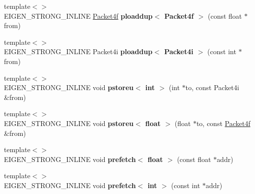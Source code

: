\begin{DoxyCompactItemize}
\item 
\mbox{\label{namespace_eigen_1_1internal_a4f98fd07c1d5009e6b536dd757688074}} 
{\footnotesize template$<$$>$ }\\E\+I\+G\+E\+N\+\_\+\+S\+T\+R\+O\+N\+G\+\_\+\+I\+N\+L\+I\+NE \hyperlink{struct_eigen_1_1internal_1_1_packet4f}{Packet4f} {\bfseries ploaddup$<$ Packet4f $>$} (const float $\ast$from)
\item 
\mbox{\label{namespace_eigen_1_1internal_a3ddf82b3b7cd925ffb814a9baca92fe5}} 
{\footnotesize template$<$$>$ }\\E\+I\+G\+E\+N\+\_\+\+S\+T\+R\+O\+N\+G\+\_\+\+I\+N\+L\+I\+NE Packet4i {\bfseries ploaddup$<$ Packet4i $>$} (const int $\ast$from)
\item 
\mbox{\label{namespace_eigen_1_1internal_abe9341bd54c8f36e4add9c441481704c}} 
{\footnotesize template$<$$>$ }\\E\+I\+G\+E\+N\+\_\+\+S\+T\+R\+O\+N\+G\+\_\+\+I\+N\+L\+I\+NE void {\bfseries pstoreu$<$ int $>$} (int $\ast$to, const Packet4i \&from)
\item 
\mbox{\label{namespace_eigen_1_1internal_aea49c19b4b3f450da1ff1a018e958eef}} 
{\footnotesize template$<$$>$ }\\E\+I\+G\+E\+N\+\_\+\+S\+T\+R\+O\+N\+G\+\_\+\+I\+N\+L\+I\+NE void {\bfseries pstoreu$<$ float $>$} (float $\ast$to, const \hyperlink{struct_eigen_1_1internal_1_1_packet4f}{Packet4f} \&from)
\item 
\mbox{\label{namespace_eigen_1_1internal_a84729d9dc9045c5aa096ce1c355da8cc}} 
{\footnotesize template$<$$>$ }\\E\+I\+G\+E\+N\+\_\+\+S\+T\+R\+O\+N\+G\+\_\+\+I\+N\+L\+I\+NE void {\bfseries prefetch$<$ float $>$} (const float $\ast$addr)
\item 
\mbox{\label{namespace_eigen_1_1internal_af11b2c02aed99a41cf13ab7c867b5ab2}} 
{\footnotesize template$<$$>$ }\\E\+I\+G\+E\+N\+\_\+\+S\+T\+R\+O\+N\+G\+\_\+\+I\+N\+L\+I\+NE void {\bfseries prefetch$<$ int $>$} (const int $\ast$addr)
\item 
\mbox{\label{namespace_eigen_1_1internal_a2edd5c4942efc09fdf21a887d2311b6c}} 

\end{DoxyCompactItemize}
